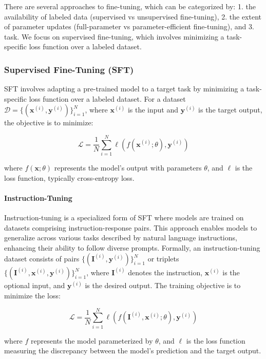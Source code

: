 \documentclass[11pt, onecolumn]{article}
\newcounter{para}
\begin{document}
There are several approaches to fine-tuning, which can be categorized by: 1. the availability of labeled data (supervised vs unsupervised fine-tuning), 2. the extent of parameter updates (full-parameter vs parameter-efficient fine-tuning), and 3. task. We focus on supervised fine-tuning, which involves minimizing a task-specific loss function over a labeled dataset.

\subsubsection{Supervised Fine-Tuning (SFT)}\label{sec:pre-sft}

SFT involves adapting a pre-trained model to a target task by minimizing a task-specific loss function over a labeled dataset. For a dataset \( \mathcal{D} = \{(\mathbf{x}^{(i)}, \mathbf{y}^{(i)})\}_{i=1}^N \), where \( \mathbf{x}^{(i)} \) is the input and \( \mathbf{y}^{(i)} \) is the target output, the objective is to minimize:

\[
\mathcal{L} = \frac{1}{N} \sum_{i=1}^N \ell(f(\mathbf{x}^{(i)}; \theta), \mathbf{y}^{(i)})
\]

where \( f(\mathbf{x}; \theta) \) represents the model's output with parameters \( \theta \), and \( \ell \) is the loss function, typically cross-entropy loss.

\paragraph{Instruction-Tuning} \label{sec:pre-it}

Instruction-tuning is a specialized form of SFT where models are trained on datasets comprising instruction-response pairs. This approach enables models to generalize across various tasks described by natural language instructions, enhancing their ability to follow diverse prompts. Formally, an instruction-tuning dataset consists of pairs \( \{(\mathbf{I}^{(i)}, \mathbf{y}^{(i)})\}_{i=1}^N \) or triplets \( \{(\mathbf{I}^{(i)}, \mathbf{x}^{(i)}, \mathbf{y}^{(i)})\}_{i=1}^N \), where \( \mathbf{I}^{(i)} \) denotes the instruction, \( \mathbf{x}^{(i)} \) is the optional input, and \( \mathbf{y}^{(i)} \) is the desired output. The training objective is to minimize the loss:

\[
\mathcal{L} = \frac{1}{N} \sum_{i=1}^N \ell(f(\mathbf{I}^{(i)}, \mathbf{x}^{(i)}; \theta), \mathbf{y}^{(i)})
\]

where \( f \) represents the model parameterized by \( \theta \), and \( \ell \) is the loss function measuring the discrepancy between the model's prediction and the target output.
\end{document}
